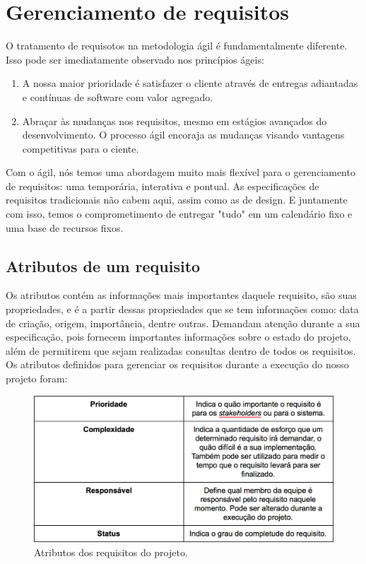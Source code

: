\chapter[Gerenciamento de requisitos]{Gerenciamento de requisitos}
O tratamento de requisotos na metodologia ágil é fundamentalmente diferente. Isso pode ser imediatamente observado nos princípios ágeis:
\begin{enumerate}
\item A nossa maior prioridade é satisfazer o cliente através de entregas adiantadas e contínuas de software com valor agregado.
\item Abraçar às mudanças nos requisitos, mesmo em estágios avançados do desenvolvimento. O processo ágil encoraja as mudanças visando vantagens competitivas para o ciente.
\end{enumerate}

Com o ágil, nós temos uma abordagem muito mais flexível para o gerenciamento de requisitos: uma temporária, interativa e pontual. As especificações de requisitos tradicionais não cabem aqui, assim como as de design. E juntamente com isso, temos o comprometimento de entregar "tudo" em um calendário fixo e uma base de recursos fixos.\cite{leffingwell}
\section{Atributos de um requisito}
Os atributos contém as informações mais importantes daquele requisito, são suas propriedades, e é a partir dessas propriedades que se tem informações como: data de criação, origem, importância, dentre outras. Demandam atenção durante a sua especificação, pois fornecem importantes informações sobre o estado do projeto, além de permitirem que sejam realizadas consultas dentro de todos os requisitos.
Os atributos definidos para gerenciar os requisitos durante a execução do nosso projeto foram:
  \begin{figure}[!htbp]
    \centering
    \includegraphics[scale=0.65]{figuras/tabela_atributos}
    \caption[Atributos dos requisitos do projeto]{Atributos dos requisitos do projeto. \footnotemark}
    \label{tabela_atributos}
  \end{figure}
  
